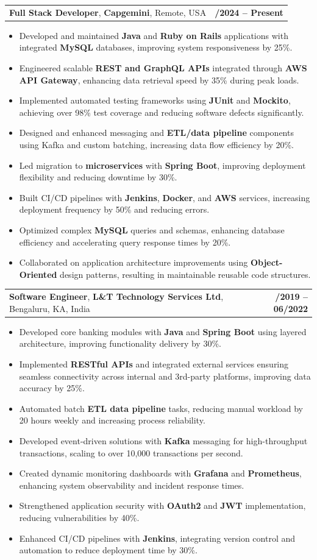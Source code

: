 \documentclass[letterpaper,11pt]{article}
\makeatletter
\newcommand{\resumeItem}[1]{
  \item\footnotesize{
    {#1 \vspace{-2pt}}
  }
}
\newcommand{\resumeSubheading}[4]{
  \vspace{-2pt}\item
    \begin{tabular*}{1.0\textwidth}[t]{l@{\extracolsep{\fill}}r}
      \textbf{\fontsize{10pt}{14pt}\selectfont #3}, \textbf{\fontsize{10pt}{14pt}\selectfont #1}, \fontsize{10pt}{14pt}\selectfont #4 & \textbf{\fontsize{10pt}{14pt}\selectfont #2} \\
    \end{tabular*}\vspace{-7pt}
}
\newcommand{\resumeItemListStart}{\begin{itemize}[leftmargin=*]}
\newcommand{\resumeItemListEnd}{\end{itemize}\vspace{-5pt}}
\makeatother
\begin{document}
    \resumeSubheading
        {Capgemini}{01/2024 -- Present}
        {Full Stack Developer}{Remote, USA}
      \resumeItemListStart
        \resumeItem{Developed and maintained \textbf{Java} and \textbf{Ruby on Rails} applications with integrated \textbf{MySQL} databases, improving system responsiveness by 25\%.}
        \resumeItem{Engineered scalable \textbf{REST and GraphQL APIs} integrated through \textbf{AWS API Gateway}, enhancing data retrieval speed by 35\% during peak loads.}
        \resumeItem{Implemented automated testing frameworks using \textbf{JUnit} and \textbf{Mockito}, achieving over 98\% test coverage and reducing software defects significantly.}
        \resumeItem{Designed and enhanced messaging and \textbf{ETL/data pipeline} components using Kafka and custom batching, increasing data flow efficiency by 20\%.}
        \resumeItem{Led migration to \textbf{microservices} with \textbf{Spring Boot}, improving deployment flexibility and reducing downtime by 30\%.}
        \resumeItem{Built CI/CD pipelines with \textbf{Jenkins}, \textbf{Docker}, and \textbf{AWS} services, increasing deployment frequency by 50\% and reducing errors.}
        \resumeItem{Optimized complex \textbf{MySQL} queries and schemas, enhancing database efficiency and accelerating query response times by 20\%.}
        \resumeItem{Collaborated on application architecture improvements using \textbf{Object-Oriented} design patterns, resulting in maintainable reusable code structures.}
      \resumeItemListEnd

    \resumeSubheading
        {L\&T Technology Services Ltd}{08/2019 -- 06/2022}
        {Software Engineer}{Bengaluru, KA, India}
      \resumeItemListStart
        \resumeItem{Developed core banking modules with \textbf{Java} and \textbf{Spring Boot} using layered architecture, improving functionality delivery by 30\%.}
        \resumeItem{Implemented \textbf{RESTful APIs} and integrated external services ensuring seamless connectivity across internal and 3rd-party platforms, improving data accuracy by 25\%.}
        \resumeItem{Automated batch \textbf{ETL data pipeline} tasks, reducing manual workload by 20 hours weekly and increasing process reliability.}
        \resumeItem{Developed event-driven solutions with \textbf{Kafka} messaging for high-throughput transactions, scaling to over 10,000 transactions per second.}
        \resumeItem{Created dynamic monitoring dashboards with \textbf{Grafana} and \textbf{Prometheus}, enhancing system observability and incident response times.}
        \resumeItem{Strengthened application security with \textbf{OAuth2} and \textbf{JWT} implementation, reducing vulnerabilities by 40\%.}
        \resumeItem{Enhanced CI/CD pipelines with \textbf{Jenkins}, integrating version control and automation to reduce deployment time by 30\%.}
      \resumeItemListEnd
\end{document}
